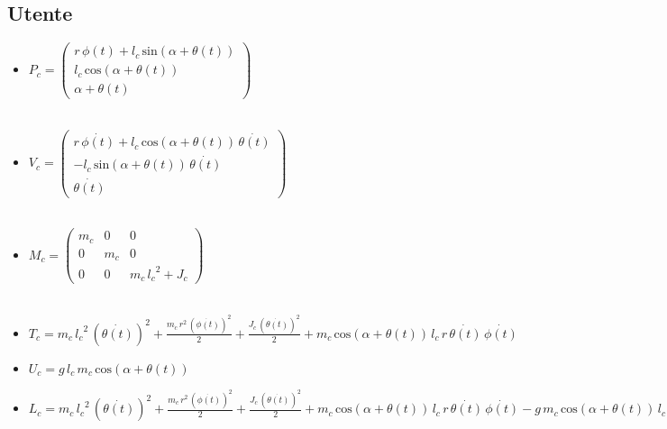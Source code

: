 \subsection{Utente}
\begin{itemize}
	
	\item \textbf{$P_c = \left(\begin{array}{c}
		r\,\phi \left(t\right)+l_c \,\mathrm{sin}\left(\alpha +\theta \left(t\right)\right)\\
		l_c \,\mathrm{cos}\left(\alpha +\theta \left(t\right)\right)\\
		\alpha +\theta \left(t\right)
		\end{array}\right)$}
	\\\\
	\item \textbf{$V_c = \left(\begin{array}{c}
		r\,\dot{\phi \left(t\right)}+l_c \,\mathrm{cos}\left(\alpha +\theta \left(t\right)\right)\,\dot{\theta \left(t\right)}\\
		-l_c \,\mathrm{sin}\left(\alpha +\theta \left(t\right)\right)\,\dot{\theta \left(t\right)}\\
		\dot{\theta \left(t\right)}
		\end{array}\right)$}
	\\\\
	\item \textbf{$M_c = \left(\begin{array}{ccc}
		m_c  & 0 & 0\\
		0 & m_c  & 0\\
		0 & 0 & m_c \,{l_c }^2 +J_c 
		\end{array}\right)$}
	\\\\
	\item \textbf{$T_c = m_c \,{l_c }^2 \,{{\left(\dot{\theta \left(t\right)}\right)}}^2 +\frac{m_c \,r^2 \,{{\left(\dot{\phi \left(t\right)}\right)}}^2 }{2}+\frac{J_c \,{{\left(\dot{\theta \left(t\right)}\right)}}^2 }{2}+m_c \,\mathrm{cos}\left(\alpha +\theta \left(t\right)\right)\,l_c \,r\,\dot{\theta \left(t\right)}\,\dot{\phi \left(t\right)}$}
	\\
	\item \textbf{$U_c = g\,l_c \,m_c \,\mathrm{cos}\left(\alpha +\theta \left(t\right)\right)$}
	\\
	\item \textbf{$L_c = m_c \,{l_c }^2 \,{{\left(\dot{\theta \left(t\right)}\right)}}^2 +\frac{m_c \,r^2 \,{{\left(\dot{\phi \left(t\right)}\right)}}^2 }{2}+\frac{J_c \,{{\left(\dot{\theta \left(t\right)}\right)}}^2 }{2}+m_c \,\mathrm{cos}\left(\alpha +\theta \left(t\right)\right)\,l_c \,r\,\dot{\theta \left(t\right)}\,\dot{\phi \left(t\right)}-g\,m_c \,\mathrm{cos}\left(\alpha +\theta \left(t\right)\right)\,l_c$}
\end{itemize}

